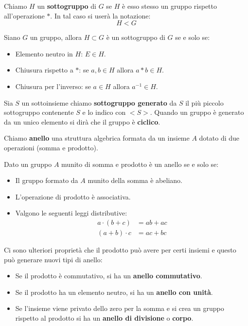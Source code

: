 \begin{defn}
	Chiamo $H$ un \textbf{sottogruppo} di $G$ se $H$ \`e esso stesso un gruppo rispetto
	all'operazione $*$. In tal caso si user\`a la notazione:
	\begin{equation*}
		H < G
	\end{equation*}
\end{defn}

\begin{theorem}
	Siano $G$ un gruppo, allora $H \subset G$ \`e un sottogruppo di $G$ se e solo se:
	\begin{itemize}
		\item Elemento neutro in $H$: $E \in H$.
		\item Chiusura rispetto a $*$: se $a, b \in H$ allora $a * b \in H$.
		\item Chiusura per l'inverso: se $a \in H$ allora $a^{-1} \in H$.
	\end{itemize}
\end{theorem}

\begin{defn}
	Sia $S$ un sottoinsieme chiamo \textbf{sottogruppo generato} da $S$ il pi\`u piccolo
	sottogruppo contenente $S$ e lo indico con $<S>$. Quando un gruppo \`e generato da un
	unico elemento si dir\`a che il gruppo \`e \textbf{ciclico}.
\end{defn}

\begin{defn}
	Chiamo \textbf{anello} una struttura algebrica formata da un insieme $A$ dotato di due
	operazioni (somma e prodotto).
\end{defn}

\begin{theorem}
	Dato un gruppo $A$ munito di somma e prodotto \`e un anello se e solo se:
	\begin{itemize}
		\item Il gruppo formato da $A$ munito della somma \`e abeliano.
		\item L'operazione di prodotto \`e associativa.
		\item Valgono le seguenti leggi distributive:
		      \begin{equation*}
			      \begin{array}{ll}
				      a \cdot (b + c) & = ab + ac \\
				      (a + b) \cdot c & = ac + bc
			      \end{array}
		      \end{equation*}
	\end{itemize}
	Ci sono ulteriori propriet\`a che il prodotto pu\`o avere per certi insiemi e questo
	pu\`o generare nuovi tipi di anello:
	\begin{itemize}
		\item Se il prodotto \`e commutativo, si ha un \textbf{anello commutativo}.
		\item Se il prodotto ha un elemento neutro, si ha un \textbf{anello con unit\`a}.
		\item Se l'insieme viene privato dello zero per la somma e si crea un gruppo rispetto
		      al prodotto si ha un \textbf{anello di divisione} o \textbf{corpo}.
	\end{itemize}
\end{theorem}

